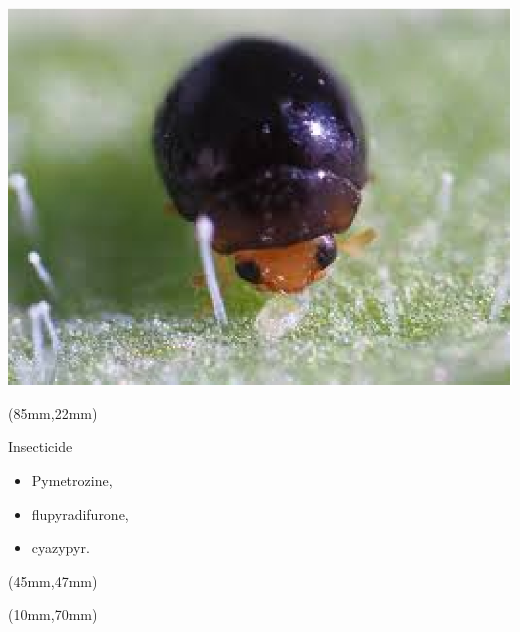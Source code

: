 \begin{frame}[plain]
{\begin{textblock*}{40mm}
			\includegraphics[width=\linewidth]{Feathergraphics/mariquita.eps}
		\end{textblock*}
	}
	{
		\begin{textblock*}{42mm}(85mm,22mm)
			\begin{graybox}{\textcolor{redstrong}{Insecticide}}
				\begin{itemize}
					\item<8-> Pymetrozine,
					\item<9-> flupyradifurone,
					\item<10-> cyazypyr.
				\end{itemize}
			\end{graybox}
		\end{textblock*}
	}
	{
		\begin{textblock*}{90mm}(45mm,47mm)	
			\begin{bibunit}[abbrv]
				\nocite{Shun-xiang2001}
				\putbib
			\end{bibunit}
		\end{textblock*}
		
		\begin{textblock*}{120mm}(10mm,70mm)
			
			\begin{bibunit}[abbrv]
				\nocite{Smith2014}
				\putbib
			\end{bibunit}
		\end{textblock*}
	}

\end{frame}
